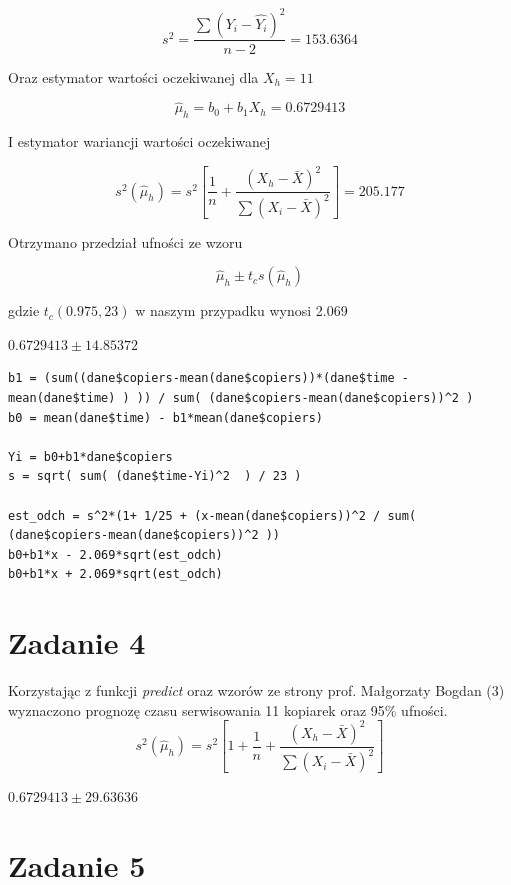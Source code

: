 \documentclass[9pt]{article}  %
\begin{document}
  $$ s^2 = \frac{ \sum{ \left( Y_i - \hat{Y_i} \right)^2 } } { n-2 } = 153.6364$$

  Oraz estymator wartości oczekiwanej dla $X_h = 11$

  $$ \hat{\mu}_h = b_0 + b_1 X_h = 0.6729413$$
  
  I estymator wariancji wartości oczekiwanej 
  
  $$ s^2( \hat{\mu}_h ) = s^2 \left[  \frac{1}{n} + \frac{(X_h-\bar{X})^2 }{\sum{(X_i-\bar{X})^2} }   \right] = 205.177$$
  
  Otrzymano przedział ufności ze wzoru

  $$ \hat{\mu}_h \pm t_c s( \hat{\mu}_h )   $$
  
  gdzie $t_c(0.975,23)$ w naszym przypadku wynosi 2.069 \newline
  
  $0.6729413 \pm 14.85372 $

    \begin{lstlisting}
b1 = (sum((dane$copiers-mean(dane$copiers))*(dane$time - mean(dane$time) ) )) / sum( (dane$copiers-mean(dane$copiers))^2 )
b0 = mean(dane$time) - b1*mean(dane$copiers)

Yi = b0+b1*dane$copiers
s = sqrt( sum( (dane$time-Yi)^2  ) / 23 )

est_odch = s^2*(1+ 1/25 + (x-mean(dane$copiers))^2 / sum( (dane$copiers-mean(dane$copiers))^2 ))
b0+b1*x - 2.069*sqrt(est_odch)
b0+b1*x + 2.069*sqrt(est_odch)
    \end{lstlisting}  



\section{Zadanie 4}

Korzystając z funkcji \textit{predict} oraz wzorów ze strony prof. Małgorzaty Bogdan (3) wyznaczono prognozę czasu serwisowania 11 kopiarek oraz 95\% ufności.
\begin{equation}
 s^2( \hat{\mu}_h ) = s^2 \left[  1+ \frac{1}{n} + \frac{(X_h-\bar{X})^2 }{\sum{(X_i-\bar{X})^2} }   \right]
\end{equation}

$0.6729413 \pm 29.63636$


\section{Zadanie 5}
    
\end{document}
